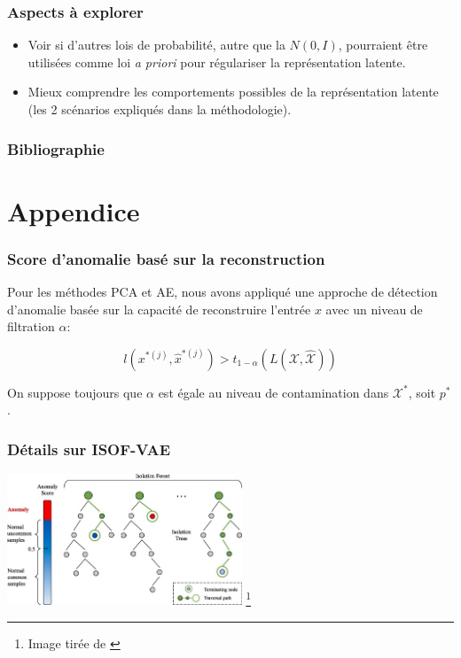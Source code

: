 \documentclass{beamer}
\newcommand\blfootnote[1]{%
	\begingroup
	\renewcommand\thefootnote{}\footnote{#1}%
	\addtocounter{footnote}{-1}%
	\endgroup
}
\begin{document}
	\begin{frame}
		\frametitle{Aspects à explorer}
		
		\begin{itemize}
			\item Voir si d'autres lois de probabilité, autre que la $N(0,I)$, pourraient être utilisées comme loi \textit{a priori} pour régulariser la représentation latente.
			\item Mieux comprendre les comportements possibles de la représentation latente (les 2 scénarios expliqués dans la méthodologie).
		\end{itemize}
		
	\end{frame}
	
	
	\begin{frame}
		\frametitle{Bibliographie}
		
	\end{frame}

	\appendix
	\section{Appendice}
	
	\begin{frame}[label=supplemental]
		\frametitle{Score d'anomalie basé sur la reconstruction}
		Pour les méthodes PCA et AE, nous avons appliqué une approche de détection d'anomalie basée sur la capacité de reconstruire l'entrée $x$ avec un niveau de filtration $\alpha$:
		
		$$
		l(x^{*(j)}, \hat{x}^{*(j)}) > t_{1-\alpha}(L(\mathcal{X}, \hat{\mathcal{X}}))
		$$
		
		On suppose toujours que $\alpha$ est égale au niveau de contamination dans $\mathcal{X^*}$, soit $p^*$.
		
	\end{frame}
	
	\begin{frame}
		\frametitle{Détails sur ISOF-VAE}
		
		\centering
		\includegraphics[width=7cm]{images/isolation-forest}
		\blfootnote{Image tirée de \cite{CHEN2020101139}}
		
	\end{frame}
	
\end{document}
